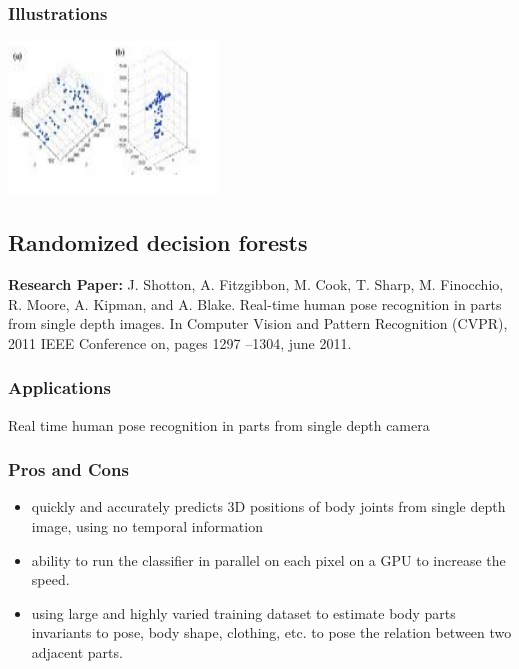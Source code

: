 \documentclass[a4paper,10pt]{report}
\begin{document}
\subsubsection{Illustrations}\newline\newline
\includegraphics{./skeltrack1.png}
\newline \newline

\subsection{Randomized decision forests}
\textbf{Research Paper:} J. Shotton, A. Fitzgibbon, M. Cook, T. Sharp, M. Finocchio, R. Moore, A. Kipman, and A. Blake. Real-time human pose recognition in parts from single depth images. In Computer Vision and Pattern Recognition (CVPR), 2011 IEEE Conference on, pages 1297 –1304, june 2011.
\subsubsection{Applications}
Real time human pose recognition in parts from single depth camera
\subsubsection{Pros and Cons}
\begin{itemize}
 \item quickly and accurately predicts 3D positions of body joints from single depth image, using no temporal information
 \item ability to run the classifier in parallel on each pixel on a GPU to increase the speed.
 \item using large and highly varied training dataset to estimate body parts invariants to pose, body shape, clothing, etc. to pose the relation between two adjacent parts.
\end{itemize}
\end{document}

